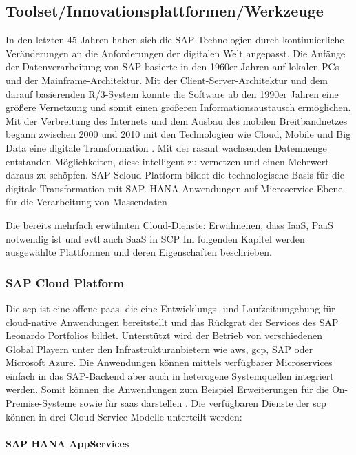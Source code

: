 \subsection{Toolset/Innovationsplattformen/Werkzeuge} \label{toolset}

In den letzten 45 Jahren haben sich die SAP-Technologien durch kontinuierliche Veränderungen an die Anforderungen der digitalen Welt angepasst. Die Anfänge der Datenverarbeitung von SAP basierte in den 1960er Jahren auf lokalen PCs und der Mainframe-Architektur. Mit der Client-Server-Architektur und dem darauf basierenden R/3-System konnte die Software ab den 1990er Jahren eine größere Vernetzung und somit einen größeren Informationsaustausch ermöglichen. Mit der Verbreitung des Internets und dem Ausbau des mobilen Breitbandnetzes begann zwischen 2000 und 2010 mit den Technologien wie Cloud, Mobile und Big Data eine digitale Transformation \citep[S. 44]{Elsner2018}. Mit der rasant wachsenden Datenmenge entstanden Möglichkeiten, diese intelligent zu vernetzen und einen Mehrwert daraus zu schöpfen.
SAP Scloud Platform bildet die technologische Basis für die digitale Transformation mit SAP.
HANA-Anwendungen auf Microservice-Ebene für die Verarbeitung von Massendaten

Die bereits mehrfach erwähnten Cloud-Dienste: Erwähnenen, dass IaaS, PaaS notwendig ist und evtl auch SaaS in SCP
Im folgenden Kapitel werden ausgewählte Plattformen und deren Eigenschaften beschrieben.

\subsubsection{SAP Cloud Platform} \label{scp}

Die \acf{scp} ist eine offene \ac{paas}, die eine Entwicklungs- und Laufzeitumgebung für cloud-native Anwendungen bereitstellt und das Rückgrat der Services des SAP Leonardo Portfolios bildet. Unterstützt wird der Betrieb von verschiedenen Global Playern unter den Infrastrukturanbietern wie \ac{aws}, \ac{gcp}, SAP oder Microsoft Azure. Die Anwendungen können mittels verfügbarer Microservices einfach in das SAP-Backend aber auch in heterogene Systemquellen integriert werden. Somit können die Anwendungen zum Beispiel Erweiterungen für die On-Premise-Systeme sowie für \ac{saas} darstellen \citep{Acharya2019}.
Die verfügbaren Dienste der \ac{scp} können in drei Cloud-Service-Modelle unterteilt werden:

\paragraph{SAP HANA AppServices}
